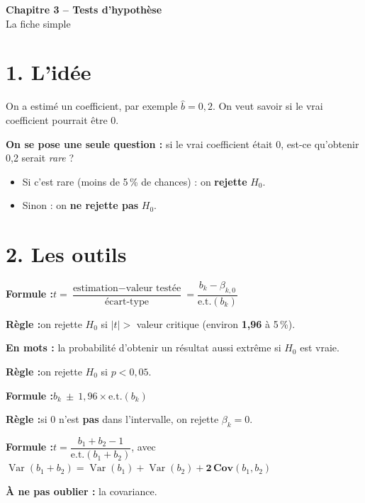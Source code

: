 \documentclass[12pt,a4paper]{article}
\newcommand{\Var}{\operatorname{Var}}\newcommand{\Cov}{\operatorname{Cov}}
\begin{document}
\begin{center}
{\LARGE\bfseries Chapitre 3 -- Tests d'hypothèse}\\[4pt]
{\large La fiche simple}
\end{center}

\section*{1. L'idée}

On a estimé un coefficient, par exemple $\hat b = 0{,}2$. On veut savoir si le vrai coefficient pourrait être 0.

\textbf{On se pose une seule question :} si le vrai coefficient était 0, est-ce qu'obtenir 0,2 serait \emph{rare} ?
\begin{itemize}
\item Si c'est rare (moins de 5\,\% de chances) : on \textbf{rejette} $H_0$.
\item Sinon : on \textbf{ne rejette pas} $H_0$.
\end{itemize}

\section*{2. Les outils}

\begin{outil}[title={Test $t$ : tester UN coefficient}]
\textbf{Formule :}\quad $t=\dfrac{\text{estimation}-\text{valeur testée}}{\text{écart-type}}=\dfrac{b_k-\beta_{k,0}}{\text{e.t.}(b_k)}$

\textbf{Règle :}\quad on rejette $H_0$ si $|t|>$ valeur critique \quad (environ \textbf{1,96} à 5\,\%).
\end{outil}

\begin{outil}[title={$p$-value : la même décision, autrement}]
\textbf{En mots :} la probabilité d'obtenir un résultat aussi extrême si $H_0$ est vraie.

\textbf{Règle :}\quad on rejette $H_0$ si $p<0{,}05$.
\end{outil}

\begin{outil}[title={Intervalle de confiance à 95\,\%}]
\textbf{Formule :}\quad $b_k\ \pm\ 1{,}96\times\text{e.t.}(b_k)$

\textbf{Règle :}\quad si 0 n'est \textbf{pas} dans l'intervalle, on rejette $\beta_k=0$.
\end{outil}

\begin{outil}[title={Tester une SOMME de coefficients : $\beta_1+\beta_2=1$}]
\textbf{Formule :}\quad $t=\dfrac{b_1+b_2-1}{\text{e.t.}(b_1+b_2)}$, \quad avec \quad $\Var(b_1+b_2)=\Var(b_1)+\Var(b_2)+\mathbf{2\,Cov}(b_1,b_2)$

\textbf{À ne pas oublier :} la covariance.
\end{outil}
\end{document}
